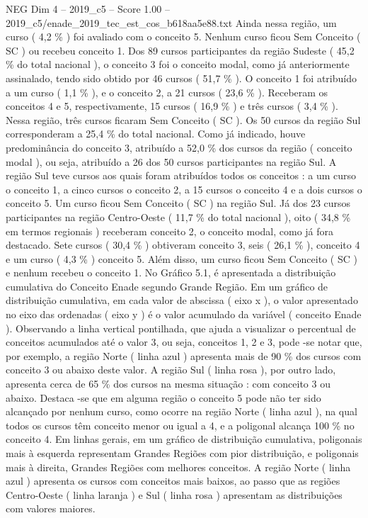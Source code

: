 \begin{textsample}{NEG Dim 4 – 2019\_c5 – Score 1.00 – 2019\_c5/enade\_2019\_tec\_est\_cos\_b618aa5e88.txt}
Ainda nessa região, um curso ( 4,2 \% ) foi avaliado com o conceito 5.
Nenhum curso ficou Sem Conceito ( SC ) ou recebeu conceito 1.
Dos 89 cursos participantes da região Sudeste ( 45,2 \% do total nacional ), o conceito 3 foi o conceito modal, como já anteriormente assinalado, tendo sido obtido por 46 cursos ( 51,7 \% ).
O conceito 1 foi atribuído a um curso ( 1,1 \% ), e o conceito 2, a 21 cursos ( 23,6 \% ).
Receberam os conceitos 4 e 5, respectivamente, 15 cursos ( 16,9 \% ) e três cursos ( 3,4 \% ).
Nessa região, três cursos ficaram Sem Conceito ( SC ).
Os 50 cursos da região Sul corresponderam a 25,4 \% do total nacional.
Como já indicado, houve predominância do conceito 3, atribuído a 52,0 \% dos cursos da região ( conceito modal ), ou seja, atribuído a 26 dos 50 cursos participantes na região Sul.
A região Sul teve cursos aos quais foram atribuídos todos os conceitos : a um curso o conceito 1, a cinco cursos o conceito 2, a 15 cursos o conceito 4 e a dois cursos o conceito 5.
Um curso ficou Sem Conceito ( SC ) na região Sul.
Já dos 23 cursos participantes na região Centro-Oeste ( 11,7 \% do total nacional ), oito ( 34,8 \% em termos regionais ) receberam conceito 2, o conceito modal, como já fora destacado.
Sete cursos ( 30,4 \% ) obtiveram conceito 3, seis ( 26,1 \% ), conceito 4 e um curso ( 4,3 \% ) conceito 5.
Além disso, um curso ficou Sem Conceito ( SC ) e nenhum recebeu o conceito 1.
No Gráfico 5.1, é apresentada a distribuição cumulativa do Conceito Enade segundo Grande Região.
Em um gráfico de distribuição cumulativa, em cada valor de abscissa ( eixo x ), o valor apresentado no eixo das ordenadas ( eixo y ) é o valor acumulado da variável ( conceito Enade ).
Observando a linha vertical pontilhada, que ajuda a visualizar o percentual de conceitos acumulados até o valor 3, ou seja, conceitos 1, 2 e 3, pode -se notar que, por exemplo, a região Norte ( linha azul ) apresenta mais de 90 \% dos cursos com conceito 3 ou abaixo deste valor.
A região Sul ( linha rosa ), por outro lado, apresenta cerca de 65 \% dos cursos na mesma situação : com conceito 3 ou abaixo.
Destaca -se que em alguma região o conceito 5 pode não ter sido alcançado por nenhum curso, como ocorre na região Norte ( linha azul ), na qual todos os cursos têm conceito menor ou igual a 4, e a poligonal alcança 100 \% no conceito 4.
Em linhas gerais, em um gráfico de distribuição cumulativa, poligonais mais à esquerda representam Grandes Regiões com pior distribuição, e poligonais mais à direita, Grandes Regiões com melhores conceitos.
A região Norte ( linha azul ) apresenta os cursos com conceitos mais baixos, ao passo que as regiões Centro-Oeste ( linha laranja ) e Sul ( linha rosa ) apresentam as distribuições com valores maiores.

\end{textsample}
